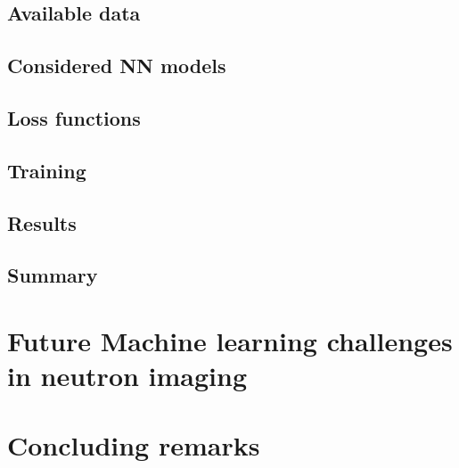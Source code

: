 \documentclass[letterpaper,10pt,english]{sphinxmanual}
\begin{document}
\section{Available data}
\label{\detokenize{ML4NeutronImageSegmentation:available-data}}

\section{Considered NN models}
\label{\detokenize{ML4NeutronImageSegmentation:considered-nn-models}}

\section{Loss functions}
\label{\detokenize{ML4NeutronImageSegmentation:loss-functions}}

\section{Training}
\label{\detokenize{ML4NeutronImageSegmentation:training}}

\section{Results}
\label{\detokenize{ML4NeutronImageSegmentation:results}}

\section{Summary}
\label{\detokenize{ML4NeutronImageSegmentation:summary}}

\chapter{Future Machine learning challenges in neutron imaging}
\label{\detokenize{ML4NeutronImageSegmentation:future-machine-learning-challenges-in-neutron-imaging}}

\chapter{Concluding remarks}
\label{\detokenize{ML4NeutronImageSegmentation:concluding-remarks}}






\renewcommand{\indexname}{Index}
\printindex
\end{document}
